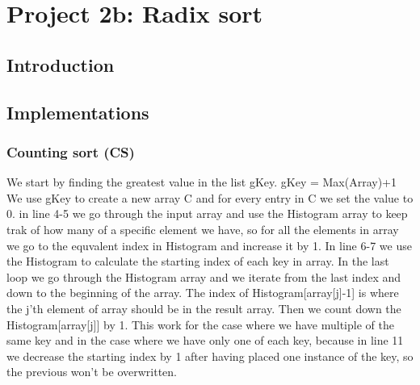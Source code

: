 
\chapter{Project 2b: Radix sort} %

\label{Chapter3} %




\section{Introduction}



\section{Implementations}




\subsection{Counting sort (CS)}
We start by finding the greatest value in the list gKey.
gKey = Max(Array)+1
We use gKey to create a new array C and for every entry in C we set the value to 0.
in line 4-5 we go through the input array and use the Histogram array to keep trak of how many of a specific element we have, so for all the elements in array we go to the equvalent index in Histogram and increase it by 1.
In line 6-7 we use the Histogram to calculate the starting index of each key in array.
In the last loop we go through the Histogram array and we iterate from the last index and down to the beginning of the array.
The index of Histogram[array[j]-1] is where the j'th element of array should be in the result array.
Then we count down the Histogram[array[j]] by 1.
This work for the case where we have multiple of the same key and in the case where we have only one of each key, because in line 11 we decrease the starting index by 1 after having placed one instance of the key, so the previous won't be overwritten.


